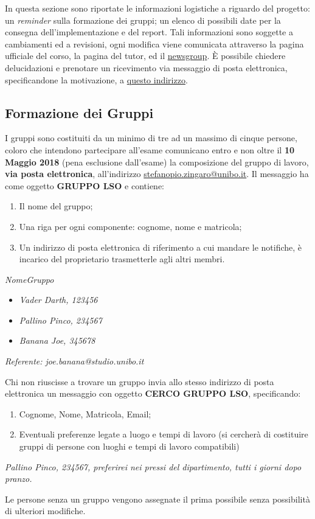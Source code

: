 In questa sezione sono riportate le informazioni logistiche a riguardo del progetto: un \textit{reminder} sulla formazione dei gruppi; un elenco di possibili date per la consegna dell'implementazione e del report. Tali informazioni sono soggette a cambiamenti ed a revisioni, ogni modifica viene comunicata attraverso la pagina ufficiale del corso, la pagina del tutor, ed il \href{https://www.wikibooks.org}{newsgroup}. È possibile chiedere delucidazioni e prenotare un ricevimento via messaggio di posta elettronica, specificandone la motivazione, a \href{mailto:stefanopio.zingaro@unibo.it}{questo indirizzo}.

\subsection{Formazione dei Gruppi}
I gruppi sono costituiti da un minimo di tre ad un massimo di cinque persone, coloro che intendono partecipare all'esame comunicano entro e non oltre il \textbf{10 Maggio 2018} (pena esclusione dall'esame) la composizione del gruppo di lavoro, \textbf{via posta elettronica}, all'indirizzo \url{stefanopio.zingaro@unibo.it}. Il messaggio ha come oggetto \textbf{GRUPPO LSO} e contiene:
\begin{enumerate}
    \item Il nome del gruppo;
    \item Una riga per ogni componente: cognome, nome e matricola;
    \item Un indirizzo di posta elettronica di riferimento a cui mandare le notifiche, è incarico del proprietario trasmetterle agli altri membri.
\end{enumerate}
\begin{tcolorbox}[colback=green!20!white,colframe=green!75!black,title=Email di esempio con oggetto \textbf{GRUPPO LSO}]
\textit{NomeGruppo}
\begin{itemize}
    \item \textit{Vader Darth, 123456}
    \item \textit{Pallino Pinco, 234567}
    \item \textit{Banana Joe, 345678}
\end{itemize}
\textit{Referente: joe.banana@studio.unibo.it}
\end{tcolorbox}

Chi non riuscisse a trovare un gruppo invia allo stesso indirizzo di posta elettronica un messaggio con oggetto \textbf{CERCO GRUPPO LSO}, specificando:
\begin{enumerate}
    \item Cognome, Nome, Matricola, Email;
    \item Eventuali preferenze legate a luogo e tempi di lavoro (si cercherà di costituire gruppi di persone con luoghi e tempi di lavoro compatibili)
\end{enumerate}
\begin{tcolorbox}[colback=green!20!white,colframe=green!75!black,title=Email di esempio con oggetto \textbf{CERCO GRUPPO LSO}]
\textit{Pallino Pinco, 234567, preferirei nei pressi del dipartimento, tutti i giorni dopo pranzo.}
\end{tcolorbox}
Le persone senza un gruppo vengono assegnate il prima possibile senza possibilità di ulteriori modifiche.

